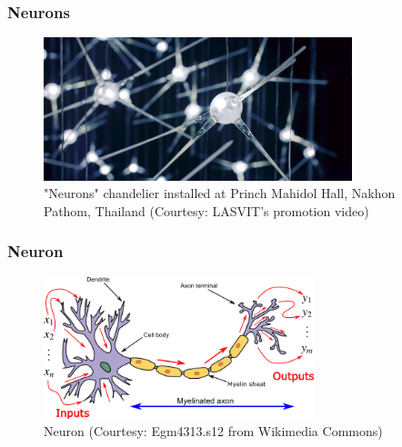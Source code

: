 \documentclass[aspectratio=169]{beamer}
\begin{document}
\begin{frame}
	\frametitle{Neurons}
	\begin{center}
		\begin{figure}
			\includegraphics[width=0.8\textwidth]{imgs/neurons_pmh.png}
			\caption{"Neurons" chandelier installed at Princh Mahidol Hall, Nakhon Pathom, Thailand (Courtesy: LASVIT's promotion video)}
		\end{figure}
	\end{center}
\end{frame}

\begin{frame}
	\frametitle{Neuron}
	\begin{center}
		\begin{figure}
			\includegraphics[width=0.7\textwidth]{imgs/neuron.png}
			\caption{Neuron (Courtesy: Egm4313.s12 from Wikimedia Commons)}
		\end{figure}
	\end{center}
\end{frame}
\end{document}
